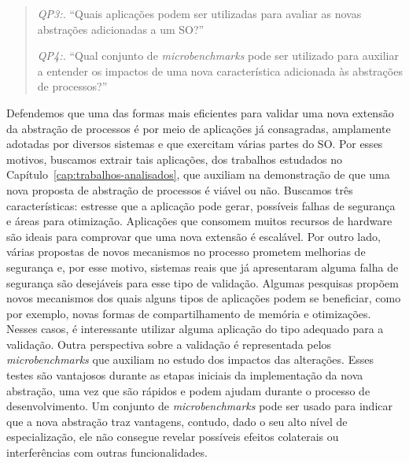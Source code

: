 \begin{quote}
  \item \emph{QP3:.} ``Quais aplicações podem ser utilizadas para avaliar as novas abstrações adicionadas a um SO?''
  \item \emph{QP4:.} ``Qual conjunto de \emph{microbenchmarks} pode ser utilizado para auxiliar a entender os impactos de uma nova característica adicionada às abstrações de processos?''
\end{quote}




Defendemos que uma das formas mais eficientes para validar uma nova extensão da
abstração de processos é por meio de aplicações já consagradas, amplamente adotadas por
diversos sistemas e que exercitam várias partes do SO. Por esses motivos,
buscamos extrair tais aplicações, dos trabalhos estudados no
Capítulo~\ref{cap:trabalhos-analisados}, que auxiliam na demonstração de que uma nova
proposta de abstração de processos é viável ou não. Buscamos três
características: estresse que a aplicação pode gerar, possíveis falhas de
segurança e áreas para otimização. Aplicações que consomem muitos recursos de
hardware são ideais para comprovar que uma nova extensão é escalável. Por outro
lado, várias propostas de novos mecanismos no processo prometem melhorias de
segurança e, por esse motivo, sistemas reais que já apresentaram alguma falha
de segurança são desejáveis para esse tipo de validação. Algumas pesquisas
propõem novos mecanismos dos quais alguns tipos de aplicações podem se
beneficiar, como por exemplo, novas formas de compartilhamento de memória e
otimizações. Nesses casos, é interessante utilizar alguma aplicação do tipo
adequado para a validação.
Outra perspectiva sobre a validação é representada pelos \emph{microbenchmarks}
que auxiliam no estudo dos impactos das alterações.  Esses testes são
vantajosos durante as etapas iniciais da implementação da nova abstração, uma
vez que são rápidos e podem ajudam durante o processo de desenvolvimento. Um
conjunto de \emph{microbenchmarks} pode ser usado para indicar que a nova
abstração traz vantagens, contudo, dado o seu alto nível de especialização, ele
não consegue revelar possíveis efeitos colaterais ou interferências com outras
funcionalidades.

